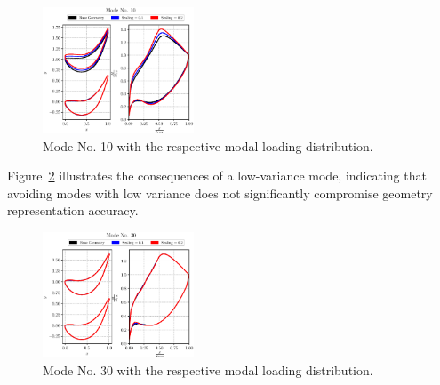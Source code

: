 \documentclass[11pt,a4paper,twocolumn]{article}
\newcommand\widthPCA{0.4}
\begin{document}
\begin{figure}[!h]
    \centering
    \includegraphics[width=\widthPCA\textwidth]{./images/mode10.eps}
    \caption{Mode No. 10 with the respective modal loading distribution.}
    \label{fig:PCAmode10}
\end{figure}

Figure~\ref{fig:PCAmode30} illustrates the consequences of a low-variance mode, indicating that avoiding modes with low variance does not significantly compromise geometry representation accuracy.

\begin{figure}[!h]
    \centering
    \includegraphics[width=\widthPCA\textwidth]{./images/mode30.eps}
    \caption{Mode No. 30 with the respective modal loading distribution.}
    \label{fig:PCAmode30}
\end{figure}
\end{document}
